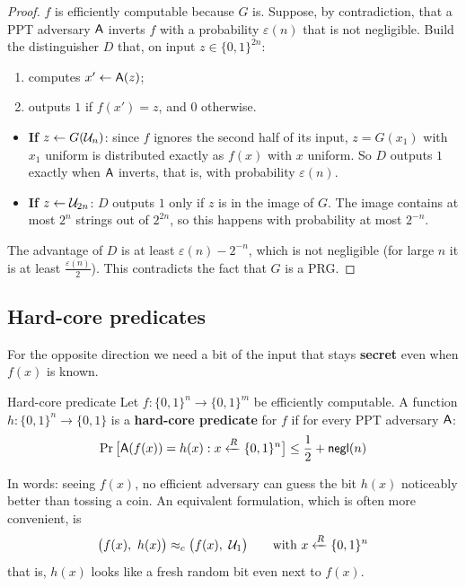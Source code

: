 \begin{proof}
  $f$ is efficiently computable because $G$ is. Suppose, by contradiction, that a PPT adversary $\mathsf{A}$ inverts $f$ with a probability $\varepsilon(n)$ that is not negligible. Build the distinguisher $D$ that, on input $z \in \{0,1\}^{2n}$:
  \begin{enumerate}
    \item computes $x' \leftarrow \mathsf{A}(z)$;
    \item outputs $1$ if $f(x') = z$, and $0$ otherwise.
  \end{enumerate}
  \begin{itemize}
    \item \textbf{If $z \leftarrow G(\mathcal{U}_{n})$}: since $f$ ignores the second half of its input, $z = G(x_1)$ with $x_1$ uniform is distributed exactly as $f(x)$ with $x$ uniform. So $D$ outputs $1$ exactly when $\mathsf{A}$ inverts, that is, with probability $\varepsilon(n)$.
    \item \textbf{If $z \leftarrow \mathcal{U}_{2n}$}: $D$ outputs $1$ only if $z$ is in the image of $G$. The image contains at most $2^n$ strings out of $2^{2n}$, so this happens with probability at most $2^{-n}$.
  \end{itemize}
  The advantage of $D$ is at least $\varepsilon(n) - 2^{-n}$, which is not negligible (for large $n$ it is at least $\frac{\varepsilon(n)}{2}$). This contradicts the fact that $G$ is a PRG.
\end{proof}

\subsection{Hard-core predicates}

For the opposite direction we need a bit of the input that stays \textbf{secret} even when $f(x)$ is known.

\begin{frameddefn}[label={def:hardcore}]{Hard-core predicate}
  Let $f : \{0,1\}^n \to \{0,1\}^m$ be efficiently computable. A function $h : \{0,1\}^n \to \{0,1\}$ is a \textbf{hard-core predicate} for $f$ if for every PPT adversary $\mathsf{A}$:
  \[
    \Pr\big[\mathsf{A}(f(x)) = h(x) : x \xleftarrow{R} \{0,1\}^n\big] \leq \frac{1}{2} + \mathsf{negl}(n)
  \]
\end{frameddefn}

In words: seeing $f(x)$, no efficient adversary can guess the bit $h(x)$ noticeably better than tossing a coin. An equivalent formulation, which is often more convenient, is
\[
  \big(f(x),\ h(x)\big) \cind \big(f(x),\ \Uni{1}\big) \qquad \text{with } x \sample \{0,1\}^n
\]
that is, $h(x)$ looks like a fresh random bit even next to $f(x)$.


